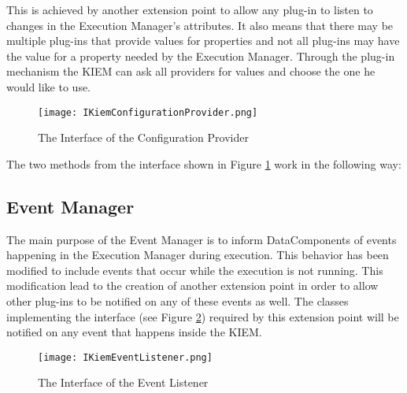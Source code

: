 This is achieved by another extension point to allow any plug-in to listen to changes
in the Execution Manager's attributes. It also means that there may be multiple
plug-ins that provide values for properties and not all plug-ins may have the value for
a property needed by the Execution Manager. Through the plug-in mechanism the \ac{KIEM}
can ask all providers for values and choose the one he would like to use.

\begin{figure}[Configuration Provider Interface]
  \centering
  \texttt{[image: IKiemConfigurationProvider.png]}
  \caption[The Interface of the Configuration Provider]%
  {The Interface of the Configuration Provider\protect\footnotemark}
  \label{fig:UMLConfigurationProvider}
\end{figure}

The two methods from the interface shown in Figure \ref{fig:UMLConfigurationProvider} work
in the following way:




\subsection{Event Manager}
The main purpose of the Event Manager is to inform DataComponents of events
happening in the Execution Manager during execution. This behavior has been modified to include 
events that occur while the execution is not running. This modification lead to the 
creation of another extension point in order to allow other plug-ins to be notified
on any of these events as well. The classes implementing the interface 
(see Figure \ref{fig:UMLEventListener}) required by this extension point will be notified
on any event that happens inside the \ac{KIEM}.

\begin{figure}[Event Listener Interface]
  \centering
  \texttt{[image: IKiemEventListener.png]}
  \caption[The Interface of the Event Listener]%
  {The Interface of the Event Listener\protect\footnotemark}
  \label{fig:UMLEventListener}
\end{figure}

